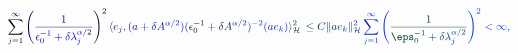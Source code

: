 \documentclass[12pt]{article}
\begin{document}
\makeatletter
\renewcommand*{\@textcolor}[3]{%
  \protect\leavevmode
  \begingroup
    \color#1{#2}#3%
  \endgroup
}
\makeatother
\begin{displaymath}
\mathcolor[RGB]{0,0,15}{\sum} _ { \mathcolor[RGB]{0,0,30}{j} \mathcolor[RGB]{0,0,45}{=} \mathcolor[RGB]{0,0,60}{1} } ^ { \mathcolor[RGB]{0,0,75}{\infty} } \mathcolor[RGB]{0,0,90}{\left(} \mathcolor[RGB]{0,0,105}{\frac { \mathcolor[RGB]{0,0,120}{1} } { \mathcolor[RGB]{0,0,135}{\epsilon} _ { \mathcolor[RGB]{0,0,150}{0} } ^ { \mathcolor[RGB]{0,0,165}{-} \mathcolor[RGB]{0,0,180}{1} } \mathcolor[RGB]{0,0,195}{+} \mathcolor[RGB]{0,0,210}{\delta} \mathcolor[RGB]{0,0,225}{\lambda} _ { \mathcolor[RGB]{0,0,240}{j} } ^ { \mathcolor[RGB]{0,0,255}{\alpha} \mathcolor[RGB]{0,15,0}{/} \mathcolor[RGB]{0,15,15}{2} } } } \mathcolor[RGB]{0,15,30}{\right)} ^ { \mathcolor[RGB]{0,15,45}{2} } \mathcolor[RGB]{0,15,60}{\langle} \mathcolor[RGB]{0,15,75}{e} _ { \mathcolor[RGB]{0,15,90}{j} } \mathcolor[RGB]{0,15,105}{,} \mathcolor[RGB]{0,15,120}{(} \mathcolor[RGB]{0,15,135}{a} \mathcolor[RGB]{0,15,150}{+} \mathcolor[RGB]{0,15,165}{\delta} \mathcolor[RGB]{0,15,180}{A} ^ { \mathcolor[RGB]{0,15,195}{\alpha} \mathcolor[RGB]{0,15,210}{/} \mathcolor[RGB]{0,15,225}{2} } \mathcolor[RGB]{0,15,240}{)} \mathcolor[RGB]{0,15,255}{(} \mathcolor[RGB]{0,30,0}{\epsilon} _ { \mathcolor[RGB]{0,30,15}{0} } ^ { \mathcolor[RGB]{0,30,30}{-} \mathcolor[RGB]{0,30,45}{1} } \mathcolor[RGB]{0,30,60}{+} \mathcolor[RGB]{0,30,75}{\delta} \mathcolor[RGB]{0,30,90}{A} ^ { \mathcolor[RGB]{0,30,105}{\alpha} \mathcolor[RGB]{0,30,120}{/} \mathcolor[RGB]{0,30,135}{2} } \mathcolor[RGB]{0,30,150}{)} ^ { \mathcolor[RGB]{0,30,165}{-} \mathcolor[RGB]{0,30,180}{2} } \mathcolor[RGB]{0,30,195}{(} \mathcolor[RGB]{0,30,210}{a} \mathcolor[RGB]{0,30,225}{e} _ { \mathcolor[RGB]{0,30,240}{k} } \mathcolor[RGB]{0,30,255}{)} \mathcolor[RGB]{0,45,0}{\rangle} _ { \mathcal { \mathcolor[RGB]{0,45,15}{H} } } ^ { \mathcolor[RGB]{0,45,30}{2} } \, \mathcolor[RGB]{0,45,45}{\leq} \mathcolor[RGB]{0,45,60}{C} \mathcolor[RGB]{0,45,75}{\|} \mathcolor[RGB]{0,45,90}{a} \mathcolor[RGB]{0,45,105}{e} _ { \mathcolor[RGB]{0,45,120}{k} } \mathcolor[RGB]{0,45,135}{\|} _ { \mathcal { \mathcolor[RGB]{0,45,150}{H} } } ^ { \mathcolor[RGB]{0,45,165}{2} } \mathcolor[RGB]{0,45,180}{\sum} _ { \mathcolor[RGB]{0,45,195}{j} \mathcolor[RGB]{0,45,210}{=} \mathcolor[RGB]{0,45,225}{1} } ^ { \mathcolor[RGB]{0,45,240}{\infty} } \mathcolor[RGB]{0,45,255}{\left(} \mathcolor[RGB]{0,60,0}{\frac { \mathcolor[RGB]{0,60,15}{1} } { \mathcolor[RGB]{0,60,30}{\eps} _ { \mathcolor[RGB]{0,60,45}{0} } ^ { \mathcolor[RGB]{0,60,60}{-} \mathcolor[RGB]{0,60,75}{1} } \mathcolor[RGB]{0,60,90}{+} \mathcolor[RGB]{0,60,105}{\delta} \mathcolor[RGB]{0,60,120}{\lambda} _ { \mathcolor[RGB]{0,60,135}{j} } ^ { \mathcolor[RGB]{0,60,150}{\alpha} \mathcolor[RGB]{0,60,165}{/} \mathcolor[RGB]{0,60,180}{2} } } } \mathcolor[RGB]{0,60,195}{\right)} ^ { \mathcolor[RGB]{0,60,210}{2} } \mathcolor[RGB]{0,60,225}{<} \mathcolor[RGB]{0,60,240}{\infty} \mathcolor[RGB]{0,60,255}{,}
\end{displaymath}
\end{document}
